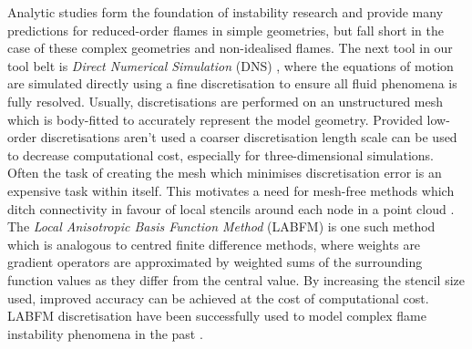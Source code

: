 Analytic studies form the foundation of instability research and provide many predictions for reduced-order flames in simple geometries, but fall short in the case of these complex geometries and non-idealised flames. The next tool in our tool belt is \emph{Direct Numerical Simulation} (DNS) \cite{orszag1970AnalyticalTheoriesTurbulence}, where the equations of motion are simulated directly using a fine discretisation to ensure all fluid phenomena is fully resolved. Usually, discretisations are performed on an unstructured mesh which is body-fitted to accurately represent the model geometry. Provided low-order discretisations aren't used a coarser discretisation length scale can be used to decrease computational cost, especially for three-dimensional simulations. Often the task of creating the mesh which minimises discretisation error is an expensive task within itself. This motivates a need for mesh-free methods which ditch connectivity in favour of local stencils around each node in a point cloud \cite{garg2018MeshfreeMethodsComprehensive, li2002MeshfreeParticleMethods}. The \emph{Local Anisotropic Basis Function Method} (LABFM) \cite{king2020HighOrderDifference, king2022HighOrderSimulationsIsothermal} is one such method which is analogous to centred finite difference methods, where weights are gradient operators are approximated by weighted sums of the surrounding function values as they differ from the central value. By increasing the stencil size used, improved accuracy can be achieved at the cost of computational cost. LABFM discretisation have been successfully used to model complex flame instability phenomena in the past \cite{king2024MeshFreeFrameworkHighOrdera, broadley2025HighorderMeshfreeDirect}.

